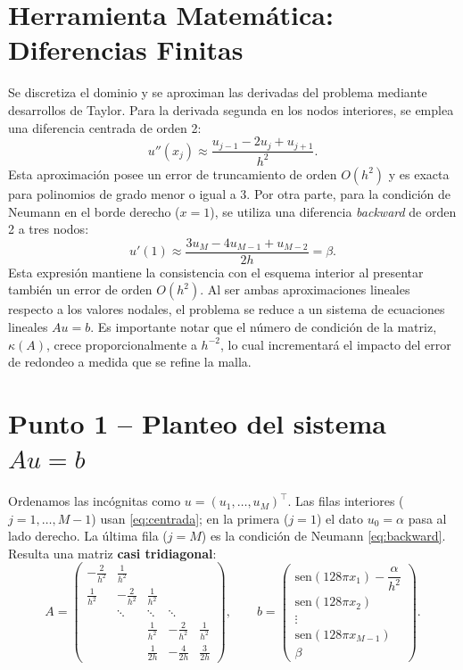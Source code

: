 \documentclass[]{report}
\begin{document}
\section*{Herramienta Matemática: Diferencias Finitas}

Se discretiza el dominio y se aproximan las derivadas del problema mediante desarrollos de Taylor. Para la derivada segunda en los nodos interiores, se emplea una diferencia centrada de orden 2:
\begin{equation}
u''(x_j)\approx\frac{u_{j-1}-2u_j+u_{j+1}}{h^2}.
\label{eq:centrada}
\end{equation}
Esta aproximación posee un error de truncamiento de orden $O(h^2)$ y es exacta para polinomios de grado menor o igual a 3. Por otra parte, para la condición de Neumann en el borde derecho ($x=1$), se utiliza una diferencia \textit{backward} de orden 2 a tres nodos:
\begin{equation}
u'(1)\approx\frac{3u_M-4u_{M-1}+u_{M-2}}{2h}=\beta.
\label{eq:backward}
\end{equation}
Esta expresión mantiene la consistencia con el esquema interior al presentar también un error de orden $O(h^2)$. Al ser ambas aproximaciones lineales respecto a los valores nodales, el problema se reduce a un sistema de ecuaciones lineales $Au=b$. Es importante notar que el número de condición de la matriz, $\kappa(A)$, crece proporcionalmente a $h^{-2}$, lo cual incrementará el impacto del error de redondeo a medida que se refine la malla.

\section*{Punto 1 -- Planteo del sistema $Au=b$}

Ordenamos las incógnitas como $u=(u_1,\dots,u_M)^\top$. Las filas interiores
($j=1,\dots,M-1$) usan \eqref{eq:centrada}; en la primera ($j=1$) el dato $u_0=\alpha$
pasa al lado derecho. La última fila ($j=M$) es la condición de Neumann
\eqref{eq:backward}. Resulta una matriz \textbf{casi tridiagonal}:
\begin{equation}
A=\begin{pmatrix}
-\frac{2}{h^2} & \frac{1}{h^2} & & & \\[2pt]
\frac{1}{h^2} & -\frac{2}{h^2} & \frac{1}{h^2} & & \\[2pt]
 & \ddots & \ddots & \ddots & \\[2pt]
 & & \frac{1}{h^2} & -\frac{2}{h^2} & \frac{1}{h^2}\\[2pt]
 & & \frac{1}{2h} & -\frac{4}{2h} & \frac{3}{2h}
\end{pmatrix},
\qquad
b=\begin{pmatrix}
\text{sen}(128\pi x_1)-\dfrac{\alpha}{h^2}\\[4pt]
\text{sen}(128\pi x_2)\\
\vdots\\
\text{sen}(128\pi x_{M-1})\\[2pt]
\beta
\end{pmatrix}.
\label{eq:sistema}
\end{equation}
\end{document}
